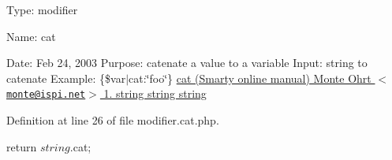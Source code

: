 \-Type\-: modifier\par
 \-Name\-: cat\par
 \-Date\-: \-Feb 24, 2003 \-Purpose\-: catenate a value to a variable \-Input\-: string to catenate \-Example\-: \{\$var$|$cat\-:\char`\"{}foo\char`\"{}\} \hyperlink{}{cat (\-Smarty online manual)  \-Monte \-Ohrt $<$\href{mailto:monte@ispi.net}{\tt monte@ispi.\-net}$>$  1.  string  string  string }

\-Definition at line 26 of file modifier.\-cat.\-php.


\begin{DoxyCode}
{
        return $string . $cat;
}
\end{DoxyCode}
